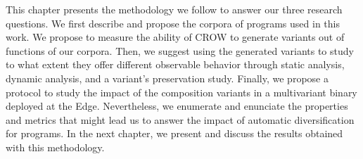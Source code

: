 This chapter presents the methodology we follow to answer our three research questions. We first describe and propose the corpora of programs used in this work. We propose to measure the ability of CROW to generate variants out of  functions of our corpora. Then, we suggest using the generated variants to study to what extent they offer different observable behavior through static analysis, dynamic analysis, and a variant's preservation study. Finally, we propose a protocol to study the impact of the composition variants in a multivariant binary deployed at the Edge. Nevertheless, we enumerate and enunciate the properties and metrics that might lead us to answer the impact of automatic diversification for \wasm programs. In the next chapter, we present and discuss the results obtained with this methodology.
